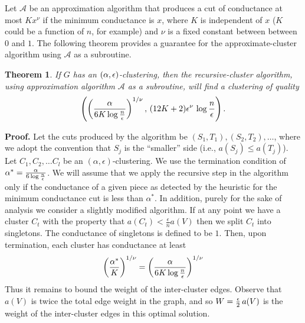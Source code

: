 \documentclass{book}
\newtheorem{theorem}{Theorem}[chapter]
\numberwithin{exercise}{chapter}
\begin{document}
Let $\mathcal{A}$ be an approximation
algorithm that produces a cut of conductance at most
$Kx^\nu$ if the minimum conductance is $x$, where $K$ is independent
of $x$ ($K$ could be a function of $n$, for example) and $\nu$ is a fixed
constant between between $0$ and $1$. The following theorem provides
a guarantee for the approximate-cluster algorithm using $\mathcal{A}$ as a subroutine.

\begin{theorem}\label{thm:gen}
If $G$ has an $(\alpha,\epsilon)$-clustering, then the recursive-cluster algorithm, using approximation
algorithm $\mathcal{A}$ as a subroutine, will find a clustering of quality
$$\left(\left(\frac{\alpha}{6K \log \frac{n}{\epsilon}}\right)^{1/\nu}, \,(12K+2)\epsilon^\nu\,\log \frac{n}{\epsilon}\right).$$
\end{theorem}

\noindent
{\bf Proof.}
Let the cuts produced by the algorithm be $(S_1,T_1),(S_2,T_2),
\ldots $, where we adopt the convention that $S_j$ is the ``smaller''
side (i.e., $a(S_j)\leq a(T_j)$).
Let $C_1,C_2,\ldots C_l$ be an $(\alpha, \epsilon )$-clustering.
We use the
termination condition of
$\alpha^*=\frac{\alpha}{6\log \frac{n}{\epsilon}}$.
We will assume that we apply the
recursive step in the algorithm only if the conductance of
a given piece as detected by the heuristic for the minimum conductance
cut is less than $\alpha^*$. In addition, purely for
the sake of analysis we consider a slightly modified algorithm.
If at any point we have a cluster $C_t$ with the property that
$a(C_t)< \frac{\epsilon}{n} a(V)$ then we split $C_t$ into singletons.
The conductance of singletons is defined to be $1$.
Then, upon termination, each cluster has conductance at least
$$\left(\frac{\alpha^*}{K}\right)^{1/\nu}
= \left(\frac{\alpha}{6K \log \frac{n}{\epsilon}}\right)^{1/\nu}$$
Thus it remains to bound the weight of the
inter-cluster edges.
Observe that $a(V)$ is twice the total edge weight in the graph, and
so $W= \frac{\epsilon}{2}\,a(V)$ is the weight of the inter-cluster edges in this
optimal solution.
\end{document}
